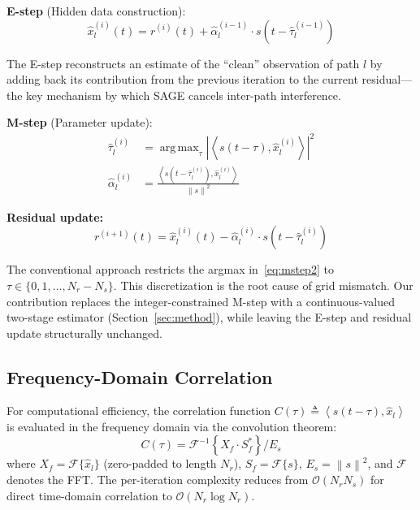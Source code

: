 \documentclass[a4paper,fleqn]{cas-dc}
\DeclareMathOperator*{\argmax}{arg\,max}
\newcommand{\Fc}{\mathcal{F}}
\newcommand{\bigO}{\mathcal{O}}
\newcommand{\norm}[1]{\left\lVert #1 \right\rVert}
\newcommand{\abs}[1]{\left| #1 \right|}
\newcommand{\inner}[2]{\left\langle #1, #2 \right\rangle}
\newcommand{\hb}[1]{\hat{#1}}
\begin{document}
\textbf{E-step} (Hidden data construction):
\begin{equation}
\hb{x}_l^{(i)}(t) = r^{(i)}(t) + \hb{\alpha}_l^{(i-1)} \cdot s\!\left(t - \hb{\tau}_l^{(i-1)}\right)
\label{eq:estep}
\end{equation}

The E-step reconstructs an estimate of the ``clean'' observation of path $l$ by adding back its contribution from the previous iteration to the current residual---the key mechanism by which SAGE cancels inter-path interference.

\textbf{M-step} (Parameter update):
\begin{align}
\hb{\tau}_l^{(i)} &= \argmax_{\tau} \abs{\inner{s(t-\tau)}{\hb{x}_l^{(i)}}}^2 \label{eq:mstep2} \\
\hb{\alpha}_l^{(i)} &= \frac{\inner{s(t-\hb{\tau}_l^{(i)})}{\hb{x}_l^{(i)}}}{\norm{s}^2} \label{eq:amp}
\end{align}

\textbf{Residual update:}
\begin{equation}
r^{(i+1)}(t) = \hb{x}_l^{(i)}(t) - \hb{\alpha}_l^{(i)} \cdot s\!\left(t - \hb{\tau}_l^{(i)}\right)
\label{eq:resid}
\end{equation}

The conventional approach restricts the argmax in~\eqref{eq:mstep2} to $\tau \in \{0, 1, \ldots, N_r - N_s\}$. This discretization is the root cause of grid mismatch. Our contribution replaces the integer-constrained M-step with a continuous-valued two-stage estimator (Section~\ref{sec:method}), while leaving the E-step and residual update structurally unchanged.

\subsection{Frequency-Domain Correlation}

For computational efficiency, the correlation function $C(\tau) \triangleq \inner{s(t-\tau)}{\hb{x}_l}$ is evaluated in the frequency domain via the convolution theorem:
\begin{equation}
C(\tau) = \Fc^{-1}\!\left\{ X_f \cdot S_f^* \right\} / E_s
\label{eq:fftcorr}
\end{equation}
where $X_f = \Fc\{\hb{x}_l\}$ (zero-padded to length $N_r$), $S_f = \Fc\{s\}$, $E_s = \norm{s}^2$, and $\Fc$ denotes the FFT. The per-iteration complexity reduces from $\bigO(N_r N_s)$ for direct time-domain correlation to $\bigO(N_r \log N_r)$.
\end{document}
